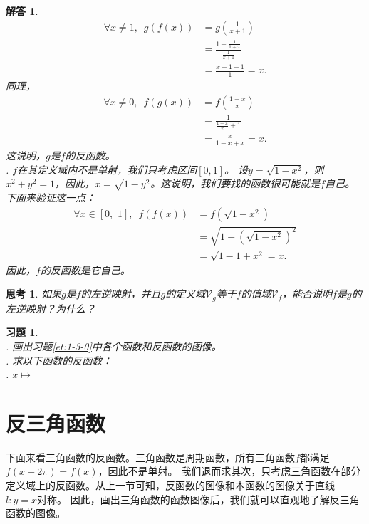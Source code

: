 \documentclass[12pt,UTF8]{ctexbook}
\newtheorem{sk}{思考}[section]
\newtheorem*{so}{解答}
\newtheorem{xt}{习题}[section]
\begin{document}
\begin{so}
\begin{align*}
        \forall x\neq 1, \,\,\, g(f(x)) &= g\left(\frac{1}{x+1}\right)  \\
                                  &= \frac{1 - \frac{1}{1 + x}}{\frac{1}{x + 1}}  \\
                                  &= \frac{x + 1 - 1}{1} = x. 
    \end{align*} 
    同理，
    \begin{align*}
        \forall x \neq 0, \,\,\, f(g(x)) &= f\left(\frac{1 - x}{x}\right)  \\
                                  &= \frac{1}{\frac{1 - x}{x} + 1}  \\
                                  &= \frac{x}{1 - x + x} = x. 
    \end{align*} 
    这说明，$g$是$f$的反函数。\\  
    . $f$在其定义域内不是单射，我们只考虑区间$[0,1]$。
    设$y = \sqrt{1 - x^2}$，则$x^2 + y^2 = 1$，因此，$x = \sqrt{1 - y^2}$。这说明，我们要找的函数很可能就是$f$自己。
    下面来验证这一点：
    \begin{align*}
        \forall x\in [0,\,\,1], \,\,\, f(f(x)) &= f\left(\sqrt{1 - x^2}\right)  \\
                                  &= \sqrt{1 - \left(\sqrt{1 - x^2}\right)^2}  \\
                                  &= \sqrt{1 - 1 + x^2} = x. 
    \end{align*} 
    因此，$f$的反函数是它自己。
\end{so}

\begin{sk}
    如果$g$是$f$的左逆映射，并且$g$的定义域$\mathcal{V}_g$等于$f$的值域$\mathcal{V}_f$，能否说明$f$是$g$的左逆映射？为什么？
\end{sk}
\begin{xt}
    \mbox{} \\
    . 画出习题\ref{et:1-3-0}中各个函数和反函数的图像。\\
    . 求以下函数的反函数：\\
    . $x\mapsto $
\end{xt}

\section{反三角函数}

下面来看三角函数的反函数。三角函数是周期函数，所有三角函数$f$都满足$f(x+2\pi) = f(x)$，因此不是单射。
我们退而求其次，只考虑三角函数在部分定义域上的反函数。从上一节可知，反函数的图像和本函数的图像关于直线$l: y = x$对称。
因此，画出三角函数的函数图像后，我们就可以直观地了解反三角函数的图像。
\end{document}
